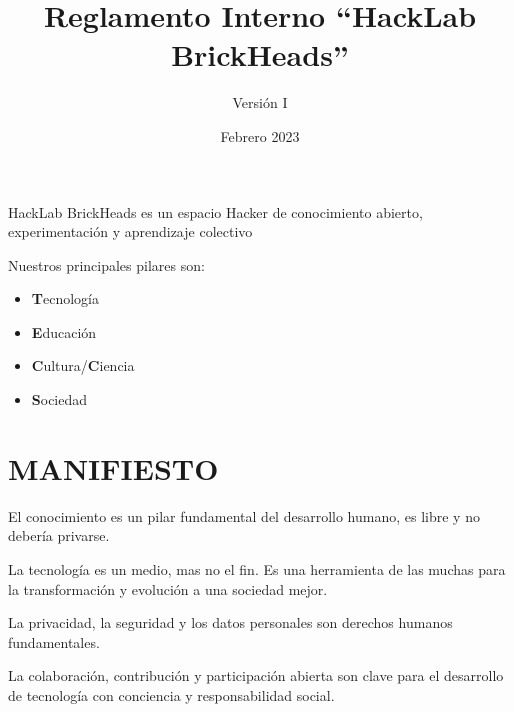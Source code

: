 \documentclass[12pt, letterpaper]{article}
\title{Reglamento Interno ``HackLab BrickHeads''}
\author{Versión I}
\date{Febrero 2023}
\begin{document}
    \maketitle
    \hspace{1cm}
    \begin{center}
        HackLab BrickHeads es un espacio Hacker de conocimiento abierto, 
        experimentación y aprendizaje colectivo
    \end{center}

    Nuestros principales pilares son:
    \begin{itemize}
        \item \textbf{T}ecnología
        \item \textbf{E}ducación
        \item \textbf{C}ultura/\textbf{C}iencia
        \item \textbf{S}ociedad
    \end{itemize}

\section{MANIFIESTO}
    El conocimiento es un pilar fundamental del desarrollo humano, es libre y no
    debería privarse.

    La tecnología es un medio, mas no el fin. Es una herramienta de las muchas 
    para la transformación y evolución a una sociedad mejor.

    La privacidad, la seguridad y los datos personales son derechos humanos
    fundamentales.

    La colaboración, contribución y participación abierta son clave para el
    desarrollo de tecnología con conciencia y responsabilidad social.
\end{document}
